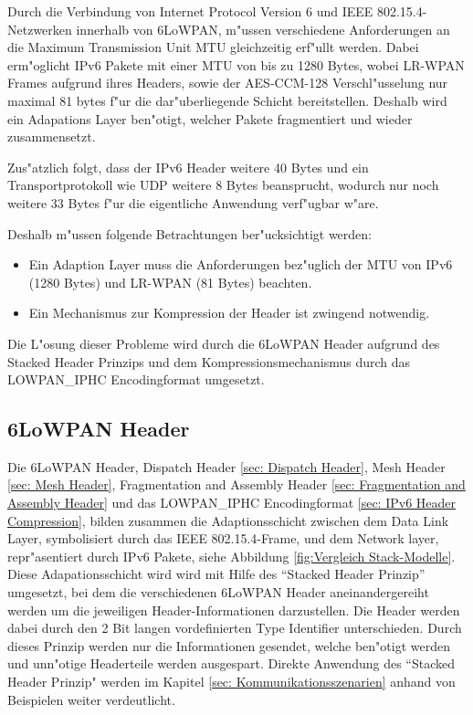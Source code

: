 \documentclass[final]{lktseminar}
\begin{document}
Durch die Verbindung von Internet Protocol Version 6 und IEEE 802.15.4-Netzwerken innerhalb
von 6LoWPAN, m"ussen verschiedene Anforderungen an die Maximum Transmission Unit MTU\cite{rfc4944}
gleichzeitig erf"ullt werden. Dabei erm"oglicht IPv6 Pakete mit einer MTU von bis zu 1280 Bytes,
wobei LR-WPAN Frames aufgrund ihres Headers, sowie der AES-CCM-128 Verschl"usselung nur
maximal 81 bytes f"ur die dar"uberliegende Schicht bereitstellen.
Deshalb wird ein Adapations Layer ben"otigt, welcher Pakete fragmentiert und wieder zusammensetzt.

Zus"atzlich folgt, dass der IPv6 Header weitere 40 Bytes und ein Transportprotokoll wie UDP
weitere 8 Bytes beansprucht, wodurch nur noch weitere 33 Bytes f"ur die eigentliche Anwendung verf"ugbar w"are.

Deshalb m"ussen folgende Betrachtungen ber"ucksichtigt werden:

\begin{itemize}
    \item Ein Adaption Layer muss die Anforderungen bez"uglich der MTU von IPv6 (1280 Bytes) und LR-WPAN (81 Bytes) beachten.
    \item Ein Mechanismus zur Kompression der Header ist zwingend notwendig.
\end{itemize}

Die L"osung dieser Probleme wird durch die 6LoWPAN Header aufgrund des Stacked Header Prinzips und dem
 Kompressionsmechanismus durch das LOWPAN\_IPHC Encodingformat umgesetzt.
\newpage


\subsection{6LoWPAN Header}
\label{sec: 6LoWPAN Header}

Die 6LoWPAN Header, Dispatch Header \ref{sec: Dispatch Header}, Mesh Header \ref{sec: Mesh Header},
Fragmentation and Assembly Header \ref{sec: Fragmentation and Assembly Header} und das
LOWPAN\_IPHC Encodingformat \ref{sec: IPv6 Header Compression}, bilden zusammen die Adaptionsschicht zwischen dem Data Link Layer,
symbolisiert durch das IEEE 802.15.4-Frame, und dem Network layer, repr"asentiert durch IPv6 Pakete,
siehe Abbildung \ref{fig:Vergleich Stack-Modelle}. Diese Adapationsschicht wird wird mit Hilfe
des ``Stacked Header Prinzip'' umgesetzt, bei dem die verschiedenen 6LoWPAN Header aneinandergereiht
werden um die jeweiligen Header-Informationen darzustellen. Die Header werden dabei durch den
2 Bit langen vordefinierten Type Identifier unterschieden. Durch dieses Prinzip werden nur die Informationen gesendet,
welche ben"otigt werden und unn"otige Headerteile werden ausgespart. Direkte Anwendung des
``Stacked Header Prinzip" werden im Kapitel \ref{sec: Kommunikationsszenarien} anhand von
Beispielen weiter verdeutlicht.
\end{document}
